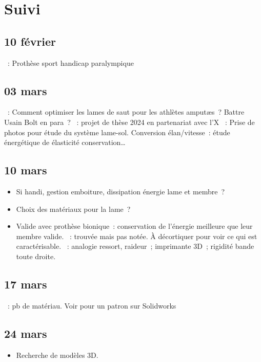 \documentclass[a4paper, 11pt, final, garamond]{book}
\begin{document}
\section{Suivi}
\subsection{10 février}
\begin{itemize}
    ~: Prothèse sport handicap paralympique
\end{itemize}

\subsection{03 mars}
\begin{itemize}
  ~: Comment optimiser les lames de saut pour les athlètes
    amputæs~? Battre Usain Bolt en para~?
  ~: projet de thèse 2024 en partenariat avec l'X
  ~: Prise de photos pour étude du système lame-sol.
    Conversion élan/vitesse~: étude énergétique de élasticité conservation…
\end{itemize}

\subsection{10 mars}
\begin{itemize}
  ~: Comment améliorer la course par prothèse~?
  \item Si handi, gestion emboiture, dissipation énergie lame et membre~?
  \item Choix des matériaux pour la lame~?
  \item Valide avec prothèse bionique~: conservation de l'énergie meilleure
    que leur membre valide.
  ~: trouvée mais pas notée. À décortiquer pour voir ce qui est
    caractérisable.
  ~: analogie ressort, raideur~; imprimante 3D~; rigidité bande
    toute droite.
\end{itemize}

\subsection{17 mars}
\begin{itemize}
    ~: pb de matériau. Voir pour un patron sur Solidworks
\end{itemize}

\subsection{24 mars}
\begin{itemize}
    \item Recherche de modèles 3D.
\end{itemize}
\end{document}
